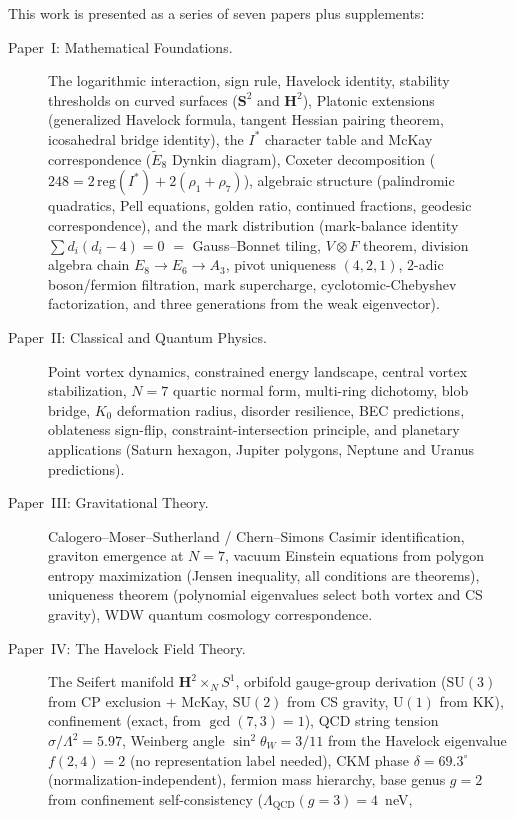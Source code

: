 This work is presented as a series of seven papers plus supplements:
\begin{description}
\item[Paper~I: Mathematical Foundations.] The logarithmic interaction,
  sign rule, Havelock identity, stability thresholds on curved surfaces
  ($\mathbf{S}^2$ and $\mathbf{H}^2$), Platonic extensions
  (generalized Havelock formula, tangent Hessian pairing theorem,
  icosahedral bridge identity), the $I^*$ character table and McKay
  correspondence ($\tilde{E}_8$ Dynkin diagram), Coxeter decomposition
  ($248 = 2\,\mathrm{reg}(I^*) + 2(\rho_1{+}\rho_7)$), algebraic structure
  (palindromic quadratics, Pell equations, golden ratio,
  continued fractions, geodesic correspondence), and the mark distribution
  (mark-balance identity $\sum d_i(d_i{-}4) = 0$ $=$ Gauss--Bonnet tiling,
  $V{\otimes}F$ theorem, division algebra chain $E_8 \to E_6 \to A_3$,
  pivot uniqueness $(4,2,1)$, $2$-adic boson/fermion filtration,
  mark supercharge, cyclotomic-Chebyshev factorization,
  and three generations from the weak eigenvector).
\item[Paper~II: Classical and Quantum Physics.] Point vortex dynamics,
  constrained energy landscape, central vortex stabilization, $N=7$
  quartic normal form, multi-ring dichotomy, blob bridge, $K_0$
  deformation radius, disorder resilience, BEC predictions,
  oblateness sign-flip, constraint-intersection principle,
  and planetary applications (Saturn hexagon, Jupiter polygons,
  Neptune and Uranus predictions).
\item[Paper~III: Gravitational Theory.] Calogero--Moser--Sutherland /
  Chern--Simons Casimir identification, graviton emergence at $N=7$,
  vacuum Einstein equations from polygon entropy maximization
  (Jensen inequality, all conditions are theorems),
  uniqueness theorem (polynomial eigenvalues select both
  vortex and CS gravity), WDW quantum cosmology correspondence.
\item[Paper~IV: The Havelock Field Theory.] The Seifert manifold
  $\mathbf{H}^2 \times_N S^1$, orbifold gauge-group derivation
  ($\mathrm{SU}(3)$ from CP exclusion + McKay,
  $\mathrm{SU}(2)$ from CS gravity, $\mathrm{U}(1)$ from KK),
  confinement (exact, from $\gcd(7,3)=1$),
  QCD string tension $\sigma/\Lambda^2 = 5.97$,
  Weinberg angle $\sin^2\theta_W = 3/11$ from the Havelock
  eigenvalue $f(2,4) = 2$ (no representation label needed),
  CKM phase $\delta = 69.3^\circ$ (normalization-independent),
  fermion mass hierarchy, base genus $g = 2$ from
  confinement self-consistency ($\Lambda_{\mathrm{QCD}}(g{=}3) = 4$~neV,

\end{description}
